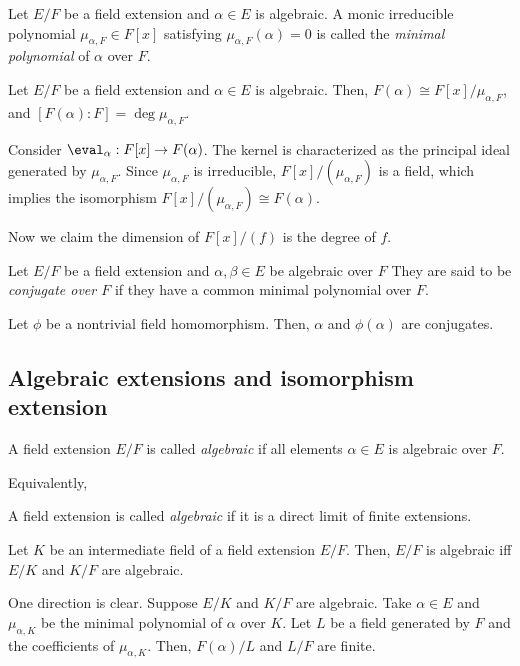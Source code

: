 \documentclass{../exp}
\begin{document}
\begin{defn}
Let $E/F$ be a field extension and $\alpha\in E$ is algebraic.
A monic irreducible polynomial $\mu_{\alpha,F}\in F[x]$ satisfying $\mu_{\alpha,F}(\alpha)=0$ is called the \emph{minimal polynomial} of $\alpha$ over $F$.
\end{defn}

\begin{thm}
Let $E/F$ be a field extension and $\alpha\in E$ is algebraic.
Then, $F(\alpha)\cong F[x]/\mu_{\alpha,F}$, and $[F(\alpha):F]=\deg\mu_{\alpha,F}$.
\end{thm}
\begin{pf}
Consider $\eval_\alpha:F[x]\to F(\alpha)$.
The kernel is characterized as the principal ideal generated by $\mu_{\alpha,F}$.
Since $\mu_{\alpha,F}$ is irreducible, $F[x]/(\mu_{\alpha,F})$ is a field, which implies the isomorphism $F[x]/(\mu_{\alpha,F})\cong F(\alpha)$.

Now we claim the dimension of $F[x]/(f)$ is the degree of $f$.
\end{pf}


\begin{defn}
Let $E/F$ be a field extension and $\alpha,\beta\in E$ be algebraic over $F$
They are said to be \emph{conjugate over $F$} if they have a common minimal polynomial over $F$.
\end{defn}

\begin{thm}
Let $\phi$ be a nontrivial field homomorphism.
Then, $\alpha$ and $\phi(\alpha)$ are conjugates.
\end{thm}








\subsection{Algebraic extensions and isomorphism extension}

\begin{defn}
A field extension $E/F$ is called \emph{algebraic} if all elements $\alpha\in E$ is algebraic over $F$.
\end{defn}

Equivalently,
\begin{defn}
A field extension is called \emph{algebraic} if it is a direct limit of finite extensions.
\end{defn}

\begin{thm}
Let $K$ be an intermediate field of a field extension $E/F$.
Then, $E/F$ is algebraic iff $E/K$ and $K/F$ are algebraic.
\end{thm}
\begin{pf}
One direction is clear.
Suppose $E/K$ and $K/F$ are algebraic.
Take $\alpha\in E$ and $\mu_{\alpha,K}$ be the minimal polynomial of $\alpha$ over $K$.
Let $L$ be a field generated by $F$ and the coefficients of $\mu_{\alpha,K}$.
Then, $F(\alpha)/L$ and $L/F$ are finite.
\end{pf}
\end{document}
